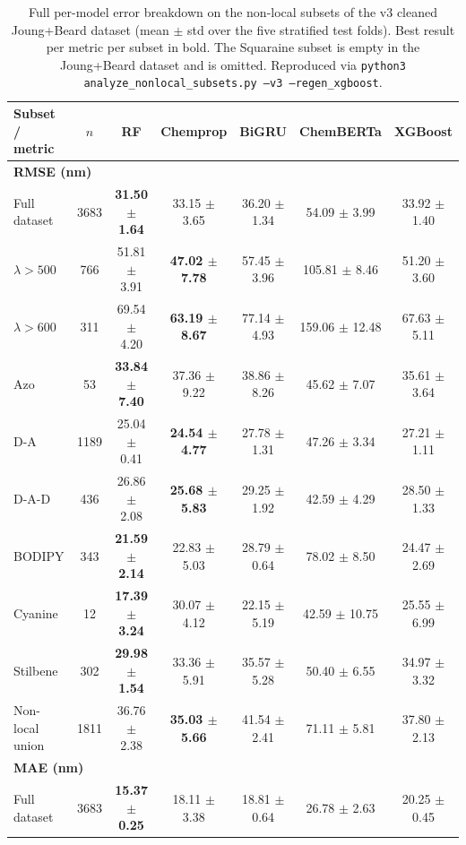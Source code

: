 \documentclass[journal=jcisd8,manuscript=suppinfo]{achemso}
\begin{document}
\begin{table}[htbp]
\centering
\caption{Full per-model error breakdown on the non-local subsets of the v3 cleaned Joung+Beard dataset (mean $\pm$ std over the five stratified test folds). Best result per metric per subset in bold. The Squaraine subset is empty in the Joung+Beard dataset and is omitted. Reproduced via \texttt{python3 analyze\_nonlocal\_subsets.py --v3 --regen\_xgboost}.}
\label{tab:si_nonlocal_full}
\scriptsize
\setlength{\tabcolsep}{3pt}
\begin{tabular}{lcccccc}
\toprule
\textbf{Subset / metric} & $n$ & \textbf{RF} & \textbf{Chemprop} & \textbf{BiGRU} & \textbf{ChemBERTa} & \textbf{XGBoost} \\
\midrule
\multicolumn{7}{l}{\textbf{RMSE (nm)}} \\
Full dataset & 3683 & \textbf{31.50 $\pm$ 1.64} & 33.15 $\pm$ 3.65 & 36.20 $\pm$ 1.34 & 54.09 $\pm$ 3.99 & 33.92 $\pm$ 1.40 \\
$\lambda > 500$ & 766 & 51.81 $\pm$ 3.91 & \textbf{47.02 $\pm$ 7.78} & 57.45 $\pm$ 3.96 & 105.81 $\pm$ 8.46 & 51.20 $\pm$ 3.60 \\
$\lambda > 600$ & 311 & 69.54 $\pm$ 4.20 & \textbf{63.19 $\pm$ 8.67} & 77.14 $\pm$ 4.93 & 159.06 $\pm$ 12.48 & 67.63 $\pm$ 5.11 \\
Azo & 53 & \textbf{33.84 $\pm$ 7.40} & 37.36 $\pm$ 9.22 & 38.86 $\pm$ 8.26 & 45.62 $\pm$ 7.07 & 35.61 $\pm$ 3.64 \\
D-A & 1189 & 25.04 $\pm$ 0.41 & \textbf{24.54 $\pm$ 4.77} & 27.78 $\pm$ 1.31 & 47.26 $\pm$ 3.34 & 27.21 $\pm$ 1.11 \\
D-A-D & 436 & 26.86 $\pm$ 2.08 & \textbf{25.68 $\pm$ 5.83} & 29.25 $\pm$ 1.92 & 42.59 $\pm$ 4.29 & 28.50 $\pm$ 1.33 \\
BODIPY & 343 & \textbf{21.59 $\pm$ 2.14} & 22.83 $\pm$ 5.03 & 28.79 $\pm$ 0.64 & 78.02 $\pm$ 8.50 & 24.47 $\pm$ 2.69 \\
Cyanine & 12 & \textbf{17.39 $\pm$ 3.24} & 30.07 $\pm$ 4.12 & 22.15 $\pm$ 5.19 & 42.59 $\pm$ 10.75 & 25.55 $\pm$ 6.99 \\
Stilbene & 302 & \textbf{29.98 $\pm$ 1.54} & 33.36 $\pm$ 5.91 & 35.57 $\pm$ 5.28 & 50.40 $\pm$ 6.55 & 34.97 $\pm$ 3.32 \\
Non-local union & 1811 & 36.76 $\pm$ 2.38 & \textbf{35.03 $\pm$ 5.66} & 41.54 $\pm$ 2.41 & 71.11 $\pm$ 5.81 & 37.80 $\pm$ 2.13 \\
\midrule
\multicolumn{7}{l}{\textbf{MAE (nm)}} \\
Full dataset & 3683 & \textbf{15.37 $\pm$ 0.25} & 18.11 $\pm$ 3.38 & 18.81 $\pm$ 0.64 & 26.78 $\pm$ 2.63 & 20.25 $\pm$ 0.45 \\

\end{tabular}
\end{table}
\end{document}
